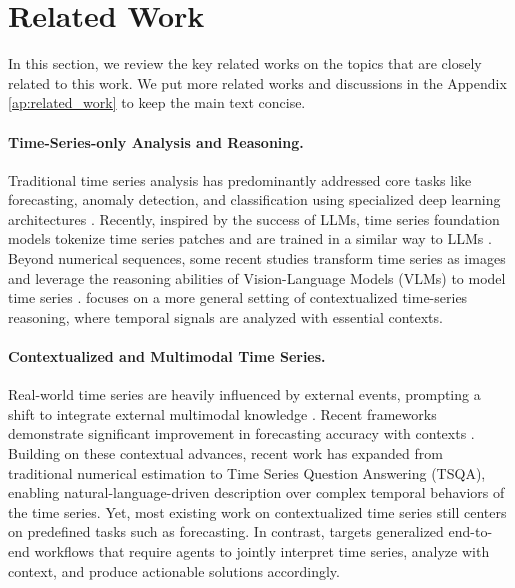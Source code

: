 \section{Related Work}

In this section, we review the key related works on the topics that are closely related to this work. We put more related works and discussions in the Appendix \ref{ap:related_work} to keep the main text concise.


\paragraph{Time-Series-only Analysis and Reasoning.}
Traditional time series analysis has predominantly addressed core tasks like forecasting, anomaly detection, and classification using specialized deep learning architectures \citep{zhou2021informer, DBLP:conf/nips/WuXWL21, DBLP:conf/iclr/NieNSK23}.
Recently, inspired by the success of LLMs, time series foundation models tokenize time series patches and are trained in a similar way to LLMs \citep{jin2024timellm, ansari2024chronos, DBLP:conf/icml/WooLKXSS24}. 
Beyond numerical sequences, some recent studies transform time series as images and leverage the reasoning abilities of Vision-Language Models (VLMs) to model time series \cite{zhong2025time,he2026harnessing}. \method focuses on a more general setting of contextualized time-series reasoning, where temporal signals are analyzed with essential contexts.


\paragraph{Contextualized and Multimodal Time Series.}
Real-world time series are heavily influenced by external events, prompting a shift to integrate external multimodal knowledge \citep{liu2025towards, DBLP:journals/corr/abs-2502-01477, sun2024test, li2024urbangpt}. 
Recent frameworks demonstrate significant improvement in forecasting accuracy with contexts \citep{DBLP:conf/ml4h/KingYM23,DBLP:conf/www/LiuHLDLHZ24}.
Building on these contextual advances, recent work has expanded from traditional numerical estimation to Time Series Question Answering (TSQA), enabling natural-language-driven description over complex temporal behaviors of the time series\citep{chen2025mtbench, wang2025chattime,jing2026tsaqa,kong2025time}. 
Yet, most existing work on contextualized time series still centers on predefined tasks such as forecasting. In contrast, \method targets generalized end-to-end workflows that require agents to jointly interpret time series, analyze with context, and produce actionable solutions accordingly.

